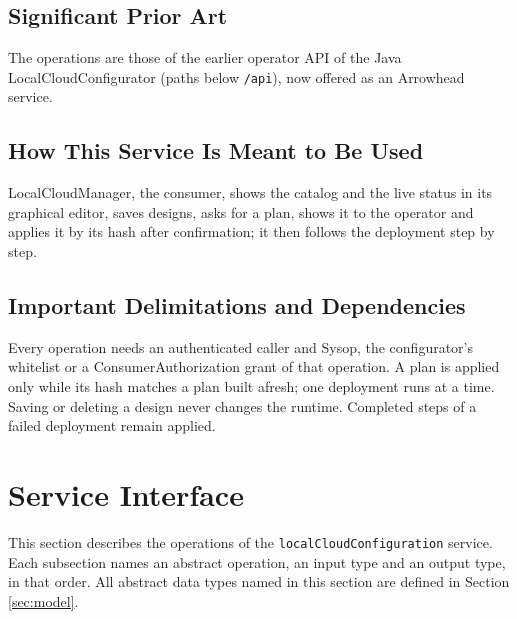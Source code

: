 \documentclass[a4paper]{arrowhead}
\begin{document}
\subsection{Significant Prior Art}

The operations are those of the earlier operator API of the Java LocalCloudConfigurator (paths below \texttt{/api}), now offered as an Arrowhead service.

\subsection{How This Service Is Meant to Be Used}

LocalCloudManager, the consumer, shows the catalog and the live status in its graphical editor, saves designs, asks for a plan, shows it to the operator and applies it by its hash after confirmation; it then follows the deployment step by step.

\subsection{Important Delimitations and Dependencies}
\label{sec:delimitations}

Every operation needs an authenticated caller and Sysop, the configurator's whitelist or a ConsumerAuthorization grant of that operation. A plan is applied only while its hash matches a plan built afresh; one deployment runs at a time. Saving or deleting a design never changes the runtime. Completed steps of a failed deployment remain applied.

\newpage

\section{Service Interface}
\label{sec:operations}

This section describes the operations of the \texttt{local\allowbreak{}Cloud\allowbreak{}Configuration} service.
Each subsection names an abstract operation, an input type and an output type, in that order.
All abstract data types named in this section are defined in Section \ref{sec:model}.
\end{document}
